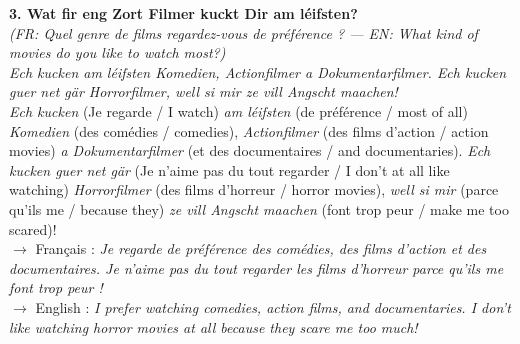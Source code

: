 \noindent\textbf{3. Wat fir eng Zort Filmer kuckt Dir am léifsten?}\\
\textit{(FR: Quel genre de films regardez-vous de préférence ? — EN: What kind of movies do you like to watch most?)}\\[0.3em]
\textit{Ech kucken am léifsten Komedien, Actionfilmer a Dokumentarfilmer. Ech kucken guer net gär Horrorfilmer, well si mir ze vill Angscht maachen!}\\
\textit{Ech kucken} (Je regarde / I watch) \textit{am léifsten} (de préférence / most of all) \textit{Komedien} (des comédies / comedies), \textit{Actionfilmer} (des films d'action / action movies) \textit{a Dokumentarfilmer} (et des documentaires / and documentaries). \textit{Ech kucken guer net gär} (Je n'aime pas du tout regarder / I don't at all like watching) \textit{Horrorfilmer} (des films d'horreur / horror movies), \textit{well si mir} (parce qu'ils me / because they) \textit{ze vill Angscht maachen} (font trop peur / make me too scared)!\\
$\rightarrow$ Français : \textit{Je regarde de préférence des comédies, des films d'action et des documentaires. Je n'aime pas du tout regarder les films d'horreur parce qu'ils me font trop peur !}\\
$\rightarrow$ English : \textit{I prefer watching comedies, action films, and documentaries. I don't like watching horror movies at all because they scare me too much!}\\[0.8em]

